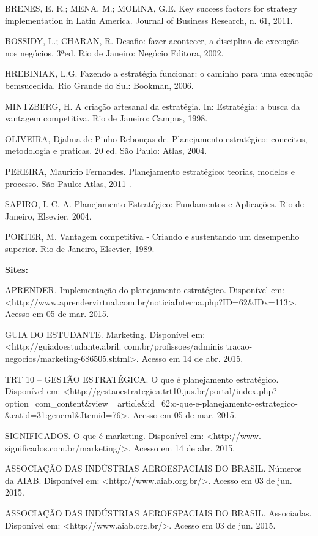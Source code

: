 \documentclass[
	12pt,				%
	openright,			%
	oneside,			%
	a4paper,			%
	english,			%
	french,				%
	spanish,			%
	brazil				%
	]{abntex2}
\begin{document}
BRENES, E. R.; MENA, M.; MOLINA, G.E. Key success factors for strategy implementation in Latin America. Journal of Business Research, n. 61, 2011.

BOSSIDY, L.; CHARAN, R. Desafio: fazer acontecer, a disciplina de execução nos negócios. 3ªed. Rio de Janeiro: Negócio Editora, 2002.

HREBINIAK, L.G. Fazendo a estratégia funcionar: o caminho para uma execução bemsucedida. Rio Grande do Sul: Bookman, 2006.

MINTZBERG, H. A criação artesanal da estratégia. In:  Estratégia: a busca da vantagem competitiva. Rio de Janeiro: Campus, 1998. 

OLIVEIRA, Djalma de Pinho Rebouças de. Planejamento estratégico: conceitos, metodologia e praticas. 20 ed. São Paulo: Atlas, 2004.

PEREIRA, Mauricio Fernandes. Planejamento estratégico: teorias, modelos e processo. São Paulo: Atlas, 2011	.
 
SAPIRO, I. C. A. Planejamento Estratégico: Fundamentos e Aplicações. Rio de Janeiro, Elsevier, 2004.

PORTER, M. Vantagem competitiva - Criando e sustentando um desempenho superior. Rio de Janeiro, Elsevier, 1989.

	\textbf{Sites:}
	
	APRENDER. Implementação do planejamento estratégico. Disponível em: \linebreak <http://www.aprendervirtual.com.br/noticiaInterna.php?ID=62\&IDx=113>. Acesso em 05 de mar. 2015.
	
	GUIA DO ESTUDANTE. Marketing. Disponível em: <http://guiadoestudante.abril. com.br/profissoes/adminis tracao-negocios/marketing-686505.shtml>. Acesso em 14 de abr. 2015.
	
	TRT 10 – GESTÃO ESTRATÉGICA. O que é planejamento estratégico. Disponível em: <http://gestaoestrategica.trt10.jus.br/portal/index.php?option=com\_content\&view =article\&id=62:o-que-e-planejamento-estrategico-\&catid=31:general\&Itemid=76>. Acesso em 05 de mar. 2015.
	
	SIGNIFICADOS. O que é marketing. Disponível em: <http://www. significados.com.br/marketing/>. Acesso em 14 de abr. 2015.

	ASSOCIAÇÃO DAS INDÚSTRIAS AEROESPACIAIS DO BRASIL. Números da AIAB. Disponível em: <http://www.aiab.org.br/>. Acesso em 03 de jun. 2015.
	
	ASSOCIAÇÃO DAS INDÚSTRIAS AEROESPACIAIS DO BRASIL. Associadas. Disponível em: <http://www.aiab.org.br/>. Acesso em 03 de jun. 2015.
	
\end{document}
